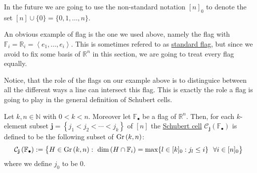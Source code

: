 In the future we are going to use the non-standard notation $[n]_0$ to denote the set $[n]\cup\{0\}=\{0,1,\ldots,n\}$.

An obvious example of flag is the one we used above, namely the flag with $\mathbb{F}_i=\mathbb{R}_i=\left<e_1,\ldots,e_i\right>$. This is sometimes refered to as \ul{standard flag}, but since we avoid to fix some basis of $\mathbb{R}^n$ in this section, we are going to treat every flag equally.

Notice, that the role of the flags on our example above is to distinguice between all the different ways a line can intersect this flag. This is exactly the role a flag is going to play in the general definition of Schubert cells.

\begin{definition} Let $k,n\in\mathbb{N}$ with $0<k<n$. Moreover let $\mathbb{F}_{\bullet}$ be a flag of $\mathbb{R}^n$. Then, for each $k$-element subset $\mathbf{j}=\left\{j_1<j_2<\cdots<j_k\right\}$ of $[n]$ the \ul{Schubert cell} $\mathcal{C}_{\mathbf{j}}\left(\mathbb{F}_{\bullet}\right)$ is defined to be the following subset of $\Gr{k}{n}$:
$$\mathcal{C}_{\mathbf{j}}\left(\mathbb{F}_{\bullet}\right):=\big\{H\in\Gr{k}{n}:\ \dim\left(H\cap\mathbb{F}_i\right)=\max\{l\in[k]_0:j_l\leq i\}\ \ \forall i\in[n]_0\big\}$$
where we define $j_0$ to be $0$.
\end{definition}

